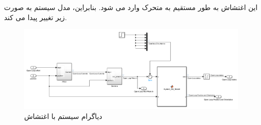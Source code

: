 این اغتشاش به طور مستقیم به متحرک وارد می شود. بنابراین، مدل سیستم به صورت زیر تغییر پیدا می کند.
\begin{figure}[H]
	\centering
	\includegraphics[width=1\linewidth]{../img/plant_Disturbance}
	\caption{دیاگرام سیستم با اغتشاش}
	\label{fig:plantdisturbance}
\end{figure}

